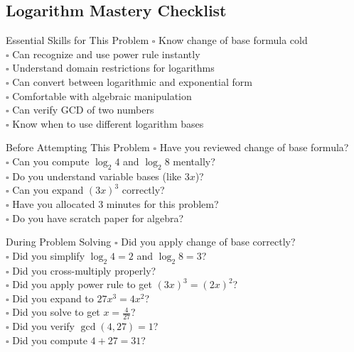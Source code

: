 \documentclass[12pt]{article}
\begin{document}
\begin{competitionbox}
\section*{Logarithm Mastery Checklist}

\begin{highlightbox}{Essential Skills for This Problem}
$\square$ Know change of base formula cold\\
$\square$ Can recognize and use power rule instantly\\
$\square$ Understand domain restrictions for logarithms\\
$\square$ Can convert between logarithmic and exponential form\\
$\square$ Comfortable with algebraic manipulation\\
$\square$ Can verify GCD of two numbers\\
$\square$ Know when to use different logarithm bases
\end{highlightbox}

\begin{highlightbox}{Before Attempting This Problem}
$\square$ Have you reviewed change of base formula?\\
$\square$ Can you compute $\log_2 4$ and $\log_2 8$ mentally?\\
$\square$ Do you understand variable bases (like $3x$)?\\
$\square$ Can you expand $(3x)^3$ correctly?\\
$\square$ Have you allocated 3 minutes for this problem?\\
$\square$ Do you have scratch paper for algebra?
\end{highlightbox}

\begin{highlightbox}{During Problem Solving}
$\square$ Did you apply change of base correctly?\\
$\square$ Did you simplify $\log_2 4 = 2$ and $\log_2 8 = 3$?\\
$\square$ Did you cross-multiply properly?\\
$\square$ Did you apply power rule to get $(3x)^3 = (2x)^2$?\\
$\square$ Did you expand to $27x^3 = 4x^2$?\\
$\square$ Did you solve to get $x = \frac{4}{27}$?\\
$\square$ Did you verify $\gcd(4,27) = 1$?\\
$\square$ Did you compute $4 + 27 = 31$?
\end{highlightbox}


\end{competitionbox}
\end{document}
